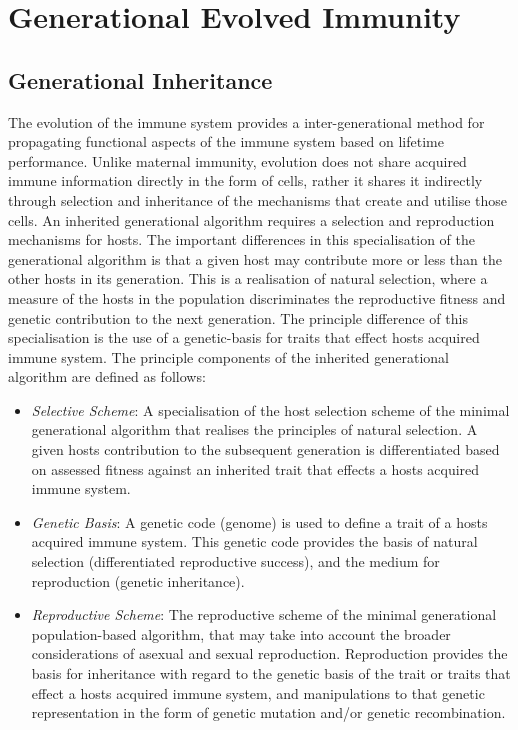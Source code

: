 %
%
\section{Generational Evolved Immunity}
\label{sec:hosts:generational:evolved}

%
%
\subsection{Generational Inheritance}
\label{sec:hosts:generational:evolved:theory}
The evolution of the immune system provides a inter-generational method for propagating functional aspects of the immune system based on lifetime performance.
Unlike maternal immunity, evolution does not share acquired immune information directly in the form of cells, rather it shares it indirectly through selection and inheritance of the mechanisms that create and utilise those cells. 
An inherited generational algorithm requires a selection and reproduction mechanisms for hosts. The important differences in this specialisation of the generational algorithm is that a given host may contribute more or less than the other hosts in its generation. This is a realisation of natural selection, where a measure of the hosts in the population discriminates the reproductive fitness and genetic contribution to the next generation. The principle difference of this specialisation is the use of a genetic-basis for traits that effect hosts acquired immune system. The principle components of the inherited generational algorithm are defined as follows:

\begin{itemize}
	\item \emph{Selective Scheme}: A specialisation of the host selection scheme of the minimal generational algorithm that realises the principles of natural selection. A given hosts contribution to the subsequent generation is differentiated based on assessed fitness against an inherited trait that effects a hosts acquired immune system. 
	\item \emph{Genetic Basis}: A genetic code (genome) is used to define a trait of a hosts acquired immune system. This genetic code provides the basis of natural selection (differentiated reproductive success), and the medium for reproduction (genetic inheritance).
	\item \emph{Reproductive Scheme}: The reproductive scheme of the minimal generational population-based algorithm, that may take into account the broader considerations of asexual and sexual reproduction. Reproduction provides the basis for inheritance with regard to the genetic basis of the trait or traits that effect a hosts acquired immune system, and manipulations to that genetic representation in the form of genetic mutation and/or genetic recombination.
\end{itemize}

